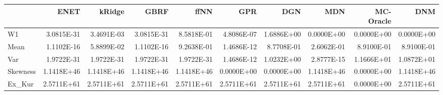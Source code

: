 \begin{tabular}{lrrrrrrrrr}
\toprule
{} &       ENET &     kRidge &       GBRF &       ffNN &        GPR &        DGN &        MDN &  MC-Oracle &        DNM \\
\midrule
W1       & 3.0815E-31 & 3.4691E-03 & 3.0815E-31 & 8.5818E-01 & 4.8086E-07 & 1.6886E+00 & 0.0000E+00 & 0.0000E+00 & 0.0000E+00 \\
Mean     & 1.1102E-16 & 5.8899E-02 & 1.1102E-16 & 9.2638E-01 & 1.4686E-12 & 8.7708E-01 & 2.6062E-01 & 8.9100E-01 & 8.9100E-01 \\
Var      & 1.9722E-31 & 1.9722E-31 & 1.9722E-31 & 1.9722E-31 & 1.4686E-12 & 1.0232E+00 & 2.8777E-15 & 1.1666E+01 & 1.0872E+01 \\
Skewness & 1.1418E+46 & 1.1418E+46 & 1.1418E+46 & 1.1418E+46 & 0.0000E+00 & 0.0000E+00 & 1.1418E+46 & 0.0000E+00 & 1.1418E+46 \\
Ex\_Kur   & 2.5711E+61 & 2.5711E+61 & 2.5711E+61 & 2.5711E+61 & 2.5711E+61 & 2.5711E+61 & 2.5711E+61 & 0.0000E+00 & 2.5711E+61 \\
\bottomrule
\end{tabular}
